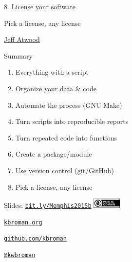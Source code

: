 \documentclass[12pt,t]{beamer}
\begin{document}
\begin{frame}{8. License your software}

\vspace{60pt}

\centerline{\large Pick a license, any license}

\vspace{18pt}

\hfill
{\textendash} \href{http://blog.codinghorror.com/pick-a-license-any-license/}{Jeff Atwood}

\end{frame}


\begin{frame}[c]{Summary}

  \begin{enumerate}
  \itemsep12pt
  \item Everything with a script
  \item Organize your data \& code
  \item Automate the process (GNU Make)
  \item Turn scripts into reproducible reports
  \item Turn repeated code into functions
  \item Create a package/module
  \item Use version control (git/GitHub)
  \item Pick a license, any license
  \end{enumerate}

\end{frame}

\begin{frame}[c]{}

\Large

Slides: \href{http://bit.ly/Memphis2015b}{\tt bit.ly/Memphis2015b} \quad
\includegraphics[height=5mm]{Figs/cc-zero.png}

\vspace{10mm}

\href{http://kbroman.org}{\tt kbroman.org}

\vspace{10mm}

\href{https://github.com/kbroman}{\tt github.com/kbroman}

\vspace{10mm}

\href{https://twitter.com/kwbroman}{\tt @kwbroman}


\end{frame}
\end{document}
